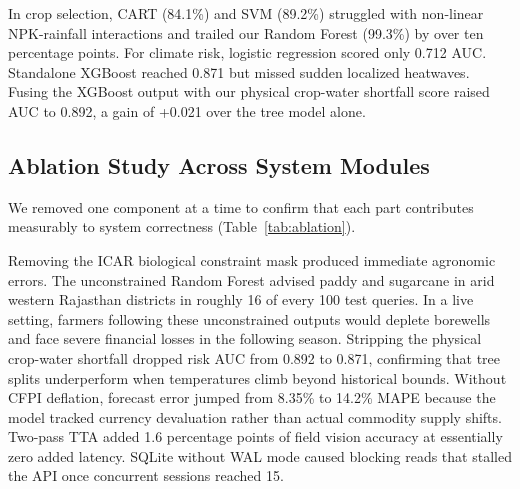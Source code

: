 \documentclass[conference]{IEEEtran}
\begin{document}
In crop selection, CART (84.1\%) and SVM (89.2\%) struggled with non-linear NPK-rainfall interactions and trailed our Random Forest (99.3\%) by over ten percentage points. For climate risk, logistic regression scored only 0.712 AUC. Standalone XGBoost reached 0.871 but missed sudden localized heatwaves. Fusing the XGBoost output with our physical crop-water shortfall score raised AUC to 0.892, a gain of +0.021 over the tree model alone.

\subsection{Ablation Study Across System Modules}
We removed one component at a time to confirm that each part contributes measurably to system correctness (Table~\ref{tab:ablation}).

\begin{table}[htbp]
\caption{Ablation Results: Per-Component Impact on System Metrics}
\label{tab:ablation}
\centering
{}
\end{table}

Removing the ICAR biological constraint mask produced immediate agronomic errors. The unconstrained Random Forest advised paddy and sugarcane in arid western Rajasthan districts in roughly 16 of every 100 test queries. In a live setting, farmers following these unconstrained outputs would deplete borewells and face severe financial losses in the following season. Stripping the physical crop-water shortfall dropped risk AUC from 0.892 to 0.871, confirming that tree splits underperform when temperatures climb beyond historical bounds. Without CFPI deflation, forecast error jumped from 8.35\% to 14.2\% MAPE because the model tracked currency devaluation rather than actual commodity supply shifts. Two-pass TTA added 1.6 percentage points of field vision accuracy at essentially zero added latency. SQLite without WAL mode caused blocking reads that stalled the API once concurrent sessions reached 15.
\end{document}
